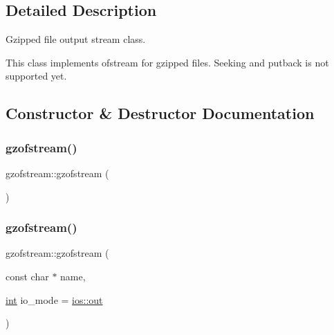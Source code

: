 \subsection{Detailed Description}
Gzipped file output stream class. 

This class implements ofstream for gzipped files. Seeking and putback is not supported yet. 

\subsection{Constructor \& Destructor Documentation}
\mbox{\label{classgzofstream_ae92ce0e4696e29741ee979f08cf5f7d2}} 
\subsubsection{\texorpdfstring{gzofstream()}{gzofstream()}\hspace{0.1cm}{\footnotesize\ttfamily [1/6]}}
{\footnotesize\ttfamily gzofstream\+::gzofstream (\begin{DoxyParamCaption}{ }\end{DoxyParamCaption})}

\mbox{\label{classgzofstream_aad6a405bc9ecfd82cc0861a15e4a6983}} 
\subsubsection{\texorpdfstring{gzofstream()}{gzofstream()}\hspace{0.1cm}{\footnotesize\ttfamily [2/6]}}
{\footnotesize\ttfamily gzofstream\+::gzofstream (\begin{DoxyParamCaption}\item[{const char $\ast$}]{name,  }\item[{\mbox{\hyperlink{ioapi_8h_a787fa3cf048117ba7123753c1e74fcd6}{int}}}]{io\+\_\+mode = {\ttfamily \mbox{\hyperlink{gun_8c_acb2d4658684492100bc328998f52ae82}{ios\+::out}}} }\end{DoxyParamCaption})}

